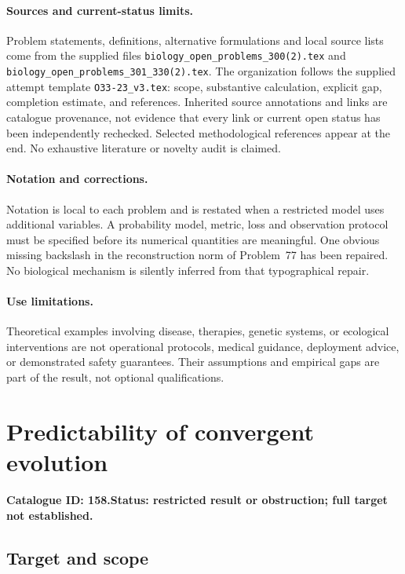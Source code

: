 \documentclass[11pt]{article}
\begin{document}
\paragraph{Sources and current-status limits.}
Problem statements, definitions, alternative formulations and local source lists
come from the supplied files
\texttt{biology\_open\_problems\_300(2).tex} and
\texttt{biology\_open\_problems\_301\_330(2).tex}.
The organization follows the supplied attempt template
\texttt{O33-23\_v3.tex}: scope, substantive calculation, explicit gap,
completion estimate, and references. Inherited source annotations and links are
catalogue provenance, not evidence that every link or current open status has
been independently rechecked. Selected methodological references appear at the
end. No exhaustive literature or novelty audit is claimed.

\paragraph{Notation and corrections.}
Notation is local to each problem and is restated when a restricted model uses
additional variables. A probability model, metric, loss and observation protocol
must be specified before its numerical quantities are meaningful. One obvious
missing backslash in the reconstruction norm of Problem~77 has been repaired.
No biological mechanism is silently inferred from that typographical repair.

\paragraph{Use limitations.}
Theoretical examples involving disease, therapies, genetic systems, or ecological
interventions are not operational protocols, medical guidance, deployment advice,
or demonstrated safety guarantees. Their assumptions and empirical gaps are part
of the result, not optional qualifications.

\setcounter{section}{157}
\section{Predictability of convergent evolution}
\label{prob:158}
\noindent\textbf{Catalogue ID: 158.}\quad \textbf{Status: restricted result or obstruction; full target not established.}
\subsection{Target and scope}
\end{document}
